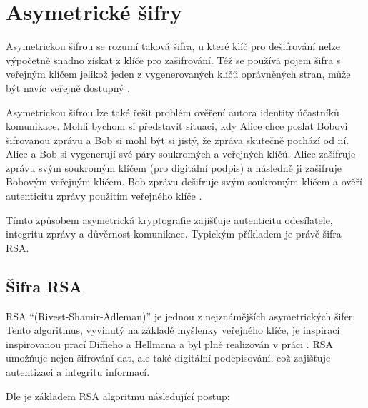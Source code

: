 \section{Asymetrické šifry}
Asymetrickou šifrou se rozumí taková šifra, u které klíč pro dešifrování nelze výpočetně snadno získat z klíče pro zašifrování. Též se používá pojem šifra s veřejným klíčem jelikož jeden z vygenerovaných klíčů oprávněných stran, může být navíc veřejně dostupný \parencite{tesar2021}.

Asymetrickou šifrou lze také řešit problém ověření autora identity účastníků komunikace. Mohli bychom si představit situaci, kdy Alice chce poslat Bobovi šifrovanou zprávu a Bob si mohl být si jistý, že zpráva skutečně pochází od ní. Alice a Bob si vygenerují své páry soukromých a veřejných klíčů. Alice zašifruje zprávu svým soukromým klíčem (pro digitální podpis) a následně ji zašifruje Bobovým veřejným klíčem. Bob zprávu dešifruje svým soukromým klíčem a ověří autenticitu zprávy použitím veřejného klíče \parencite{burda2019}.

Tímto způsobem asymetrická kryptografie zajišťuje autenticitu odesílatele, integritu zprávy a důvěrnost komunikace. Typickým příkladem je právě šifra RSA.

\subsection{Šifra RSA}
RSA \enquote{(Rivest-Shamir-Adleman)} je jednou z nejznámějších asymetrických šifer. Tento algoritmus, vyvinutý na základě myšlenky veřejného klíče, je inspirací inspirovanou prací Diffieho a Hellmana \parencite{diffie1976} a byl plně realizován v práci \textcite{rsa1978}. RSA umožňuje nejen šifrování dat, ale také digitální podepisování, což zajišťuje autentizaci a integritu informací.

Dle \textcite{rsa1978} je základem RSA algoritmu následující postup:

